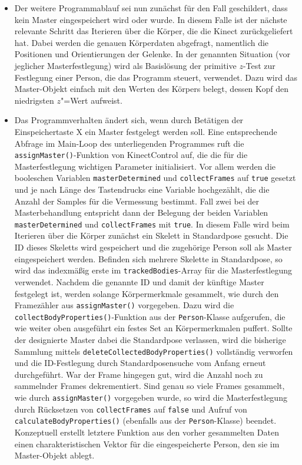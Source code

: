 \begin{itemize}
%
\item Der weitere Programmablauf sei nun zunächst für den Fall geschildert, dass kein Master eingespeichert wird oder wurde. In diesem Falle ist der nächste relevante Schritt das Iterieren über die Körper, die die Kinect zurückgeliefert hat. Dabei werden die genauen Körperdaten abgefragt, namentlich die Positionen und Orientierungen der Gelenke. In der genannten Situation (vor jeglicher Masterfestlegung) wird als Basislösung der primitive $z$-Test zur Festlegung einer Person, die das Programm steuert, verwendet. Dazu wird das Master-Objekt einfach mit den Werten des Körpers belegt, dessen Kopf den niedrigsten $z$"=Wert aufweist. 
\item Das Programmverhalten ändert sich, wenn durch Betätigen der Einspeichertaste X ein Master festgelegt werden soll. Eine entsprechende Abfrage im Main-Loop des unterliegenden Programmes ruft die \texttt{assignMaster()}-Funktion von KinectControl auf, die die für die Masterfestlegung wichtigen Parameter initialisiert. Vor allem werden die booleschen Variablen \texttt{masterDetermined} und \texttt{collectFrames} auf \texttt{true} gesetzt und je nach Länge des Tastendrucks eine Variable hochgezählt, die die Anzahl der Samples für die Vermessung bestimmt. Fall zwei bei der Masterbehandlung entspricht dann der Belegung der beiden Variablen \texttt{masterDetermined} und \texttt{collectFrames} mit \texttt{true}. In diesem Falle wird beim Iterieren über die Körper zunächst ein Skelett in Standardpose gesucht. Die ID dieses Skeletts wird gespeichert und die zugehörige Person soll als Master eingespeichert werden. Befinden sich mehrere Skelette in Standardpose, so wird das indexmäßig erste im \texttt{trackedBodies}-Array für die Masterfestlegung verwendet. Nachdem die genannte ID und damit der künftige Master festgelegt ist, werden solange Körpermerkmale gesammelt, wie durch den Framezähler aus \texttt{assignMaster()} vorgegeben. Dazu wird die \texttt{collectBodyProperties()}-Funktion aus der \texttt{Person}-Klasse aufgerufen, die wie weiter oben ausgeführt ein festes Set an Körpermerkmalen puffert. Sollte der designierte Master dabei die Standardpose verlassen, wird die bisherige Sammlung mittels \texttt{deleteCollectedBodyProperties()} vollständig verworfen und die ID-Festlegung durch Standardposensuche vom Anfang erneut durchgeführt. War der Frame hingegen gut, wird die Anzahl noch zu sammelnder Frames dekrementiert. Sind genau so viele Frames gesammelt, wie durch \texttt{assignMaster()} vorgegeben wurde, so wird die Masterfestlegung durch Rücksetzen von \texttt{collectFrames} auf \texttt{false} und Aufruf von \texttt{calculateBodyProperties()} (ebenfalls aus der \texttt{Person}-Klasse) beendet. Konzeptuell erstellt letztere Funktion aus den vorher gesammelten Daten einen charakteristischen Vektor für die eingespeicherte Person, den sie im Master-Objekt ablegt.

\end{itemize}
